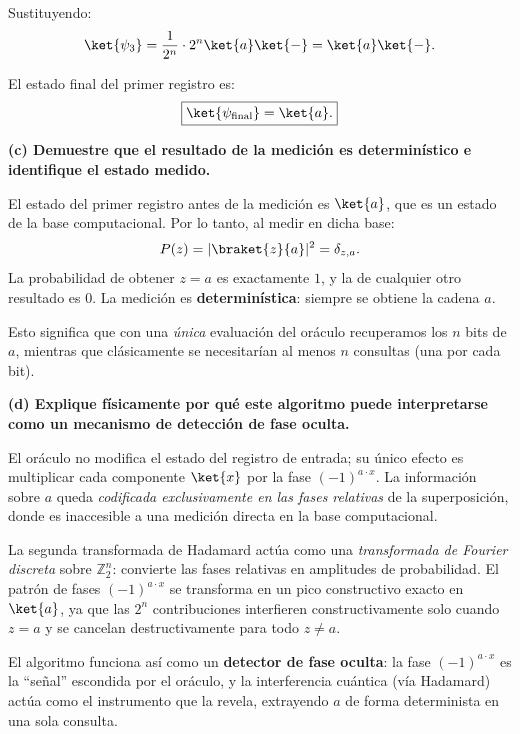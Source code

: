 Sustituyendo:
$$
    \ket{\psi_3} = \frac{1}{2^n} \cdot 2^n \ket{a}\ket{-} = \ket{a}\ket{-}.
$$

El estado final del primer registro es:
$$
    \boxed{\ket{\psi_{\text{final}}} = \ket{a}.}
$$

\vspace{0.5cm}

{\bfseries (c) Demuestre que el resultado de la medición es determinístico e identifique el estado medido.}

El estado del primer registro antes de la medición es $\ket{a}$, que es un estado de la base computacional. Por lo tanto, al medir en dicha base:
$$
    P(z) = |\braket{z}{a}|^2 = \delta_{z,a}.
$$
La probabilidad de obtener $z = a$ es exactamente $1$, y la de cualquier otro resultado es $0$. La medición es \textbf{determinística}: siempre se obtiene la cadena $a$.

Esto significa que con una \emph{única} evaluación del oráculo recuperamos los $n$ bits de $a$, mientras que clásicamente se necesitarían al menos $n$ consultas (una por cada bit).

\vspace{0.5cm}

{\bfseries (d) Explique físicamente por qué este algoritmo puede interpretarse como un mecanismo de detección de fase oculta.}

El oráculo no modifica el estado del registro de entrada; su único efecto es multiplicar cada componente $\ket{x}$ por la fase $(-1)^{a \cdot x}$. La información sobre $a$ queda \emph{codificada exclusivamente en las fases relativas} de la superposición, donde es inaccesible a una medición directa en la base computacional.

La segunda transformada de Hadamard actúa como una \emph{transformada de Fourier discreta} sobre $\mathbb{Z}_2^n$: convierte las fases relativas en amplitudes de probabilidad. El patrón de fases $(-1)^{a \cdot x}$ se transforma en un pico constructivo exacto en $\ket{a}$, ya que las $2^n$ contribuciones interfieren constructivamente solo cuando $z = a$ y se cancelan destructivamente para todo $z \neq a$.

El algoritmo funciona así como un \textbf{detector de fase oculta}: la fase $(-1)^{a \cdot x}$ es la ``señal'' escondida por el oráculo, y la interferencia cuántica (vía Hadamard) actúa como el instrumento que la revela, extrayendo $a$ de forma determinista en una sola consulta.

\vspace{1cm}